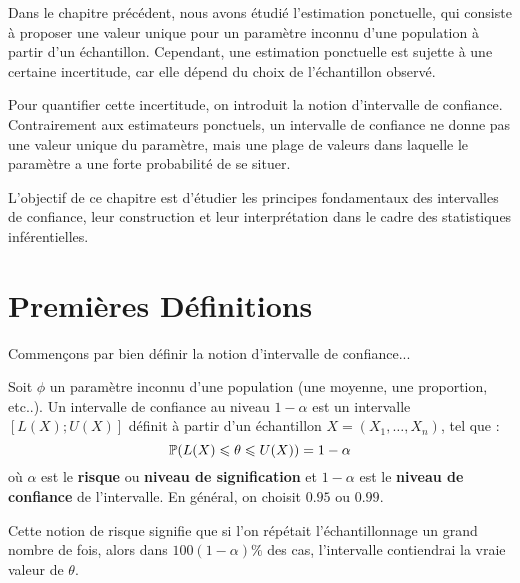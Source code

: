 
\minitoc  %

Dans le chapitre précédent, nous avons étudié l'estimation ponctuelle, qui consiste à proposer une 
valeur unique pour un paramètre inconnu d'une population à partir d’un échantillon. 
Cependant, une estimation ponctuelle est sujette à une certaine incertitude, car elle dépend du 
choix de l’échantillon observé.

Pour quantifier cette incertitude, on introduit la notion d’intervalle de confiance. 
Contrairement aux estimateurs ponctuels, un intervalle de confiance ne donne pas une valeur unique 
du paramètre, mais une plage de valeurs dans laquelle le paramètre a une forte probabilité de se situer.

L’objectif de ce chapitre est d’étudier les principes fondamentaux des intervalles de confiance, 
leur construction et leur interprétation dans le cadre des statistiques inférentielles.



\section{Premières Définitions}


Commençons par bien définir la notion d'intervalle de confiance... 

\begin{definition}
    Soit $\phi$ un paramètre inconnu d'une population (une moyenne, une proportion, etc..). 
    Un intervalle de confiance au niveau $1 - \alpha$ est un intervalle $[ L(X); U(X)]$ définit 
    à partir d'un échantillon $X = (X_1, \dots, X_n)$, tel que :
        \[ \mathbb{P}(L(X) \leqslant \theta \leqslant U(X)) = 1 - \alpha \] 
    où $\alpha$ est le \textbf{risque} ou \textbf{niveau de signification} et $1-\alpha$ 
    est le \textbf{niveau de confiance} de l'intervalle. En général, on choisit $0.95$ ou $0.99$. 
\end{definition}

Cette notion de risque signifie que si l'on répétait l'échantillonnage un grand nombre de fois, 
alors dans $100(1 - \alpha) \%$ des cas, l'intervalle contiendrai la vraie valeur de $\theta$. 

